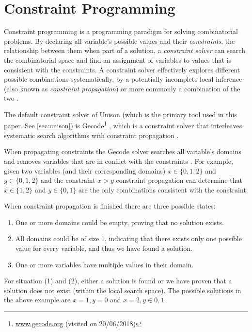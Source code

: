 \section{Constraint Programming}
\label{sec:constraint}

Constraint programming is a programming paradigm for solving combinatorial problems.
By declaring all variable's possible values and their \textit{constraints}, the relationship
between them when part of a solution, a \textit{constraint solver} can search the combinatorial
space and find an assignment of variables to values that is consistent with the constraints.
A constraint solver effectively explores different possible combinations systematically,
by a potentially incomplete local inference (also known as \textit{constraint propagation})
or more commonly a combination of the two \cite{handbook-constraint-programming}.

The default constraint solver of Unison (which is the primary tool used in this paper.
See \ref{sec:unison}) is Gecode\footnote{\url{www.gecode.org} (visited on 20/06/2018)} \cite{unison-docs},
which is a constraint solver that interleaves systematic search algorithms with constraint
propagation \cite{MPG}.

When propagating constraints the Gecode solver searches all variable's domains and removes
variables that are in conflict with the constraints \cite[Section~23.1]{MPG}. For example,
given two variables (and their corresponding domains) $x \in \{0,1,2\}$ and $y \in \{0,1,2\}$
and the constraint $x > y$ constraint propagation can determine that $x \in \{1, 2\}$ and
$y \in \{0, 1\}$ are the only combinations consistent with the constraint.

When constraint propagation is finished there are three possible states:

\begin{enumerate}
	\item One or more domains could be empty, proving that no solution exists.
	\item	All domains could be of size 1, indicating that there exists only one possible
		value for every variable, and thus we have found a solution.
	\item One or more variables have multiple values in their domain.
\end{enumerate}

For situation (1) and (2), either a solution is found or we have proven that a solution
does not exist (within the local search space). The possible solutions in the above example
are $x=1,y=0$ and $x=2,y \in {0,1}$.


